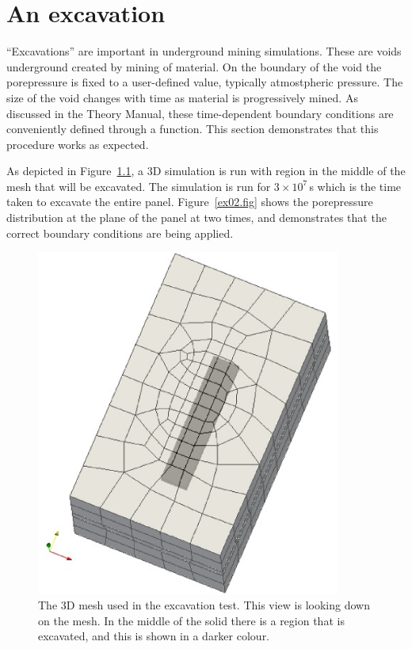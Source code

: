 \documentclass[]{scrreprt}
\begin{document}
\chapter{An excavation}
\label{ex}

``Excavations'' are important in underground mining simulations.
These are voids underground created by mining of material.  On the
boundary of the void the porepressure is fixed to a user-defined
value, typically atmostpheric pressure.  The size of the void changes
with time as material is progressively mined.  As discussed in the
Theory Manual, these time-dependent boundary conditions are
conveniently defined through a function.  This section demonstrates
that this procedure works as expected.

As depicted in Figure~\ref{ex02_3D_mesh.fig}, a 3D simulation is run
with region in the middle of the mesh that will be excavated.  The
simulation is run for $3\times 10^{7}$\,s which is the time taken to
excavate the entire panel.  Figure~\ref{ex02.fig} shows the
porepressure distribution at the plane of the panel at two times, and
demonstrates that the correct boundary conditions are being applied.

\begin{figure}[htb]
\centering
\includegraphics[width=10cm]{ex02_3D_mesh.eps}
\caption{The 3D mesh used in the excavation test.  This view is
  looking down on the mesh.  In the middle of
  the solid there is a region that is excavated, and this is shown in
  a darker colour.}
\label{ex02_3D_mesh.fig}
\end{figure}
\end{document}
